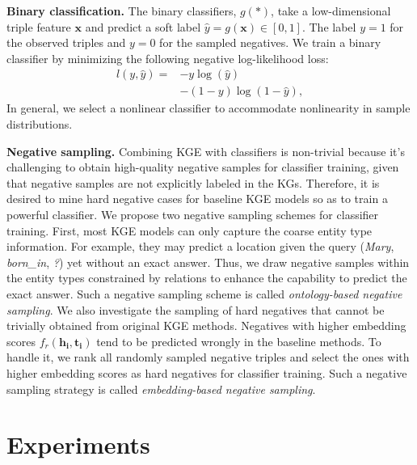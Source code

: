 \documentclass{article}
\begin{document}
\textbf{Binary classification.} The binary classifiers, $g(*)$, take a
low-dimensional triple feature $\bm{x}$ and predict a soft label
$\hat{y} = g(\bm{x}) \in [0, 1]$. The label $y = 1$ for the observed triples and $y = 0$
for the sampled negatives. We train a binary classifier by minimizing the following
negative log-likelihood loss:
\begin{equation}
\begin{split}
        l(y, \hat{y}) = {} & - y \log(\hat{y}) \\
                           & - (1 - y) \log(1 - \hat{y}), 
\end{split}
\end{equation}
In general, we select a nonlinear classifier to accommodate 
nonlinearity in sample distributions. 

\textbf{Negative sampling.} Combining KGE with classifiers is non-trivial 
because it's challenging to obtain high-quality negative samples for classifier
training, given that negative samples are not explicitly labeled in the KGs. 
Therefore, it is desired to mine hard negative cases for baseline KGE models
so as to train a powerful classifier. 
We propose two negative sampling schemes for classifier training.
First, most KGE models can only capture the
coarse entity type information. For example, they may predict a location
given the query (\emph{Mary}, \emph{born\_in}, \emph{?}) yet
without an exact answer. Thus, we draw negative samples within the
entity types constrained by relations \citep{krompass2015type}
to enhance the capability to predict the exact answer.  
Such a negative sampling scheme is called
\emph{ontology-based negative sampling}.  We also investigate the sampling of
hard negatives that cannot be trivially obtained from original KGE
methods. Negatives with higher embedding scores $f_r(\bm{h_i},
\bm{t_i})$ tend to be predicted wrongly in the baseline methods. To handle
it, we rank all randomly sampled negative triples and select the ones
with higher embedding scores as hard negatives for classifier training.
Such a negative sampling strategy is called \emph{embedding-based negative sampling}. 


\section{Experiments}\label{sec:experiment}
\end{document}

